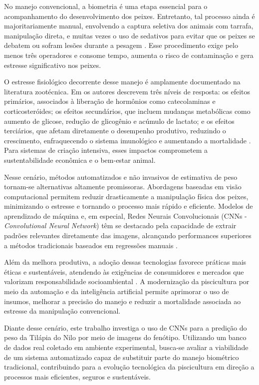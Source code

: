\documentclass[sigconf,nonacm,screen]{acmart}
\begin{document}
No manejo convencional, a biometria é uma etapa essencial para o acompanhamento do desenvolvimento dos peixes. Entretanto, tal processo ainda é majoritariamente manual, envolvendo a captura seletiva dos animais com tarrafa, manipulação direta, e muitas vezes o uso de sedativos para evitar que os peixes se debatem ou sofram lesões durante a pesagem \cite{Iwama1997, Barcellos2000}. Esse procedimento exige pelo menos três operadores e consome tempo, aumenta o risco de contaminação e gera estresse significativo nos peixes.

O estresse fisiológico decorrente desse manejo é amplamente documentado na literatura zootécnica. Em \cite{Iwama1997} os autores descrevem três níveis de resposta: os efeitos primários, associados à liberação de hormônios como catecolaminas e corticosteróides; os efeitos secundários, que incluem mudanças metabólicas como aumento de glicose, redução de glicogênio e acúmulo de lactato; e os efeitos terciários, que afetam diretamente o desempenho produtivo, reduzindo o crescimento, enfraquecendo o sistema imunológico e aumentando a mortalidade \cite{Iwama1997, Barcellos2000}. Para sistemas de criação intensiva, esses impactos comprometem a sustentabilidade econômica e o bem-estar animal.

Nesse cenário, métodos automatizados e não invasivos de estimativa de peso tornam-se alternativas altamente promissoras. Abordagens baseadas em visão computacional permitem reduzir drasticamente a manipulação física dos peixes, minimizando o estresse e tornando o processo mais rápido e eficiente. Modelos de aprendizado de máquina e, em especial, Redes Neurais Convolucionais (CNNs - \textit{Convolutional Neural Network}) têm se destacado pela capacidade de extrair padrões relevantes diretamente das imagens, alcançando performances superiores a métodos tradicionais baseados em regressões manuais \cite{RussellNorvig2016, Mitchell1997}.

Além da melhora produtiva, a adoção dessas tecnologias favorece práticas mais éticas e sustentáveis, atendendo às exigências de consumidores e mercados que valorizam responsabilidade socioambiental \cite{Domingos2015}. A modernização da piscicultura por meio da automação e da inteligência artificial permite aprimorar o uso de insumos, melhorar a precisão do manejo e reduzir a mortalidade associada ao estresse da manipulação convencional.

Diante desse cenário, este trabalho investiga o uso de CNNs para a predição do peso da Tilápia do Nilo por meio de imagens do fenótipo. Utilizando um banco de dados real coletado em ambiente experimental, busca-se avaliar a viabilidade de um sistema automatizado capaz de substituir parte do manejo biométrico tradicional, contribuindo para a evolução tecnológica da piscicultura em direção a processos mais eficientes, seguros e sustentáveis.
\end{document}
